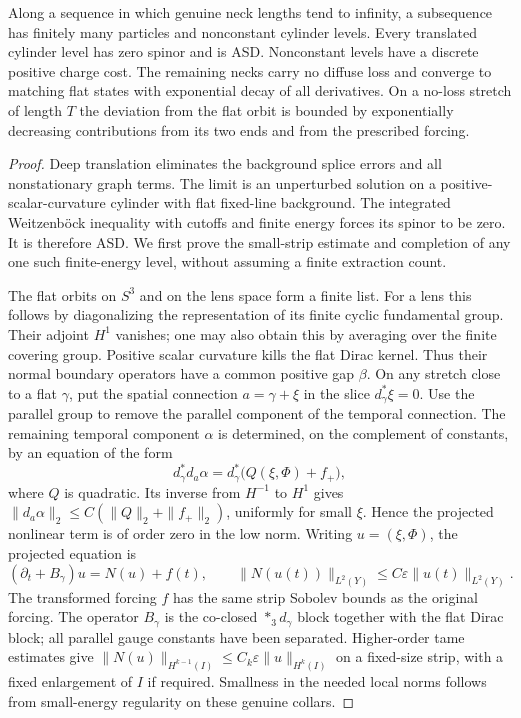 \begin{lemma}
\label{lem:analysis:neck}
Along a sequence in which genuine neck lengths tend to infinity, a
subsequence has finitely many particles and nonconstant cylinder levels.
Every translated cylinder level has zero spinor and is ASD.  Nonconstant
levels have a discrete positive charge cost.  The remaining necks carry
no diffuse loss and converge to matching flat states with exponential
decay of all derivatives.  On a no-loss stretch of length $T$ the
deviation from the flat orbit is bounded by exponentially decreasing
contributions from its two ends and from the prescribed forcing.
\end{lemma}
\begin{proof}
Deep translation eliminates the background splice errors and all
nonstationary graph terms.  The limit is an unperturbed solution on a
positive-scalar-curvature cylinder with flat fixed-line background.
The integrated Weitzenb\"ock inequality with cutoffs and finite energy
forces its spinor to be zero.  It is therefore ASD.  We first prove
the small-strip estimate and completion of any one such finite-energy
level, without assuming a finite extraction count.

The flat orbits on $S^3$ and on the lens space form a finite list.
For a lens this follows by diagonalizing the representation of its
finite cyclic fundamental group.  Their adjoint $H^1$ vanishes;
one may also obtain this by averaging over the finite covering group.
Positive scalar curvature kills the flat Dirac kernel.  Thus their
normal boundary operators have a common positive gap $\beta$.
On any stretch close to a flat $\gamma$, put the spatial connection
$a=\gamma+\xi$ in the slice $d_\gamma^*\xi=0$.  Use the parallel
group to remove the parallel component of the temporal connection.
The remaining temporal component $\alpha$ is determined, on the
complement of constants, by an equation of the form
\[
 d_\gamma^*d_a\alpha=d_\gamma^*\bigl(Q(\xi,\Phi)+f_+\bigr),
\]
where $Q$ is quadratic.  Its inverse from $H^{-1}$ to $H^1$ gives
$\|d_a\alpha\|_2\leq C(\|Q\|_2+\|f_+\|_2)$, uniformly for
small $\xi$.  Hence the projected nonlinear term is of order zero
in the low norm.  Writing $u=(\xi,\Phi)$, the projected equation is
\begin{equation}\label{eq:analysis:neck-evolution}
 (\partial_t+B_\gamma)u=N(u)+f(t),
 \qquad \|N(u(t))\|_{L^2(Y)}
             \leq C\varepsilon\|u(t)\|_{L^2(Y)}.
\end{equation}
The transformed forcing $f$ has the same strip Sobolev bounds as the
original forcing.  The operator $B_\gamma$ is the co-closed
$*_3d_\gamma$ block together with the flat Dirac block; all parallel
gauge constants have been separated.  Higher-order tame estimates
give $\|N(u)\|_{H^{k-1}(I)}\leq C_k\varepsilon\|u\|_{H^k(I)}$
on a fixed-size strip, with a fixed enlargement of $I$ if required.
Smallness in the needed local norms follows from small-energy
regularity on these genuine collars.


\end{proof}
